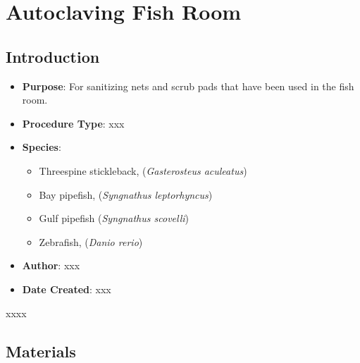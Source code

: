 \documentclass[
  letterpaper,
  DIV=11,
  numbers=noendperiod]{scrreprt}
\providecommand{\tightlist}{%
  \setlength{\itemsep}{0pt}\setlength{\parskip}{0pt}}\usepackage{longtable,booktabs,array}
\begin{document}
\hypertarget{sec-husb-autoclaving}{%
\chapter{Autoclaving Fish Room}\label{sec-husb-autoclaving}}

\hypertarget{introduction-6}{%
\section{Introduction}\label{introduction-6}}

\begin{itemize}
\tightlist
\item
  \textbf{Purpose}: For sanitizing nets and scrub pads that have been
  used in the fish room.
\item
  \textbf{Procedure Type}: xxx
\item
  \textbf{Species}:

  \begin{itemize}
  \tightlist
  \item
    Threespine stickleback, (\emph{Gasterosteus aculeatus})
  \item
    Bay pipefish, (\emph{Syngnathus leptorhyncus})
  \item
    Gulf pipefish (\emph{Syngnathus scovelli})
  \item
    Zebrafish, (\emph{Danio rerio})
  \end{itemize}
\item
  \textbf{Author}: xxx
\item
  \textbf{Date Created}: xxx
\end{itemize}

\begin{tcolorbox}[enhanced jigsaw, bottomtitle=1mm, rightrule=.15mm, toptitle=1mm, opacitybacktitle=0.6, bottomrule=.15mm, titlerule=0mm, coltitle=black, leftrule=.75mm, arc=.35mm, colback=white, colframe=quarto-callout-warning-color-frame, left=2mm, colbacktitle=quarto-callout-warning-color!10!white, title=\textcolor{quarto-callout-warning-color}{\faExclamationTriangle}\hspace{0.5em}{NOTES}, toprule=.15mm, opacityback=0, breakable]

xxxx

\end{tcolorbox}

\hypertarget{materials-6}{%
\section{Materials}\label{materials-6}}
\end{document}
